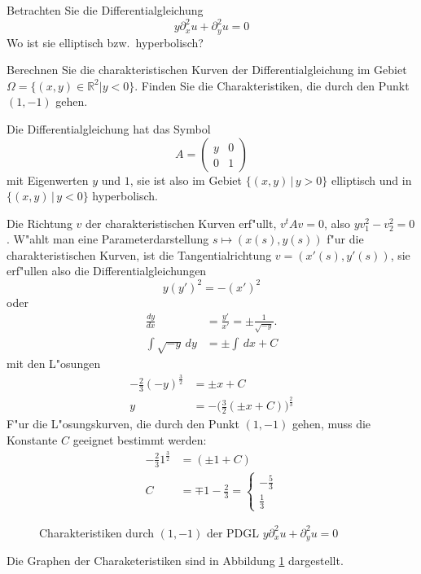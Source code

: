Betrachten Sie die Differentialgleichung
\[
y\partial_x^2u+\partial_y^2u=0
\]
Wo ist sie elliptisch bzw.~hyperbolisch?

Berechnen Sie die charakteristischen Kurven der Differentialgleichung
im Gebiet $\Omega=\{(x,y)\in\mathbb R^2|y<0\}$.
Finden Sie die Charakteristiken, die durch den Punkt
$(1,-1)$ gehen.

\begin{loesung}
Die Differentialgleichung hat das Symbol
\[
A=\begin{pmatrix}y&0\\0&1\end{pmatrix}
\]
mit Eigenwerten $y$ und $1$, sie ist also im Gebiet $\{(x,y)\,|\,y>0\}$
elliptisch und in $\{(x,y)\,|\,y<0\}$ hyperbolisch.

Die Richtung $v$ der charakteristischen Kurven erf"ullt,
$v^tAv=0$, also $yv_1^2-v_2^2=0$. W"ahlt man eine
Parameterdarstellung $s\mapsto(x(s),y(s))$ f"ur die
charakteristischen Kurven, ist die Tangentialrichtung
$v=(x'(s),y'(s))$,
sie erf"ullen also
die Differentialgleichungen
\[
y(y')^2=-(x')^2
\]
oder
\begin{align*}
\frac{dy}{dx}&=\frac{y'}{x'}=\pm\frac1{\sqrt{-y}}.
\\
\int\sqrt{-y}\,dy&=\pm\int \,dx+C
\end{align*}
mit den L"osungen
\begin{align*}
-\frac23(-y)^{\frac32}&=\pm x+C
\\
y&=-\biggl(\frac32(\pm x+C)\biggr)^{\frac23}
\end{align*}
F"ur die L"osungskurven, die durch den Punkt $(1,-1)$ gehen,
muss die Konstante $C$ geeignet bestimmt werden:
\begin{align*}
-\frac231^{\frac32}&=(\pm1+C)\\
C&=\mp 1-\frac23
=\begin{cases}
-\frac53\\
\frac13
\end{cases}
\end{align*}
\begin{figure}
\begin{center}
\end{center}
\caption{Charakteristiken durch $(1,-1)$ der PDGL $y\partial_x^2u+\partial_y^2u=0$
\label{90000006:char}}
\end{figure}
Die Graphen der Charaketeristiken sind in Abbildung \ref{90000006:char} dargestellt.
\end{loesung}
